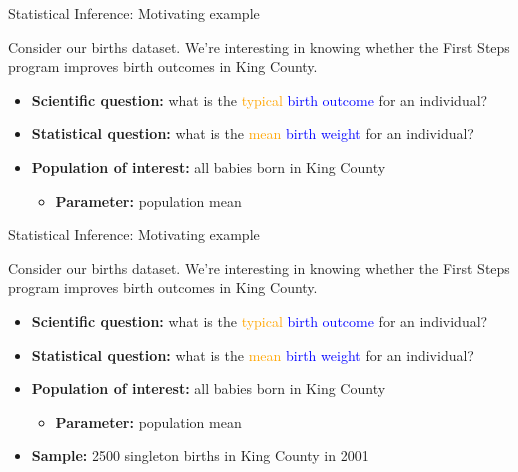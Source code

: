 \documentclass[10pt,t]{beamer}
\begin{document}
\begin{frame}{Statistical Inference: Motivating example}

Consider our births dataset. We're interesting in knowing whether the First Steps program improves birth outcomes in King County.

\vspace{0.1cm}

\begin{itemize}
	\item \textbf{Scientific question:} what is the \textcolor{orange}{typical}  \textcolor{blue}{birth outcome} for an individual?
	\item \textbf{Statistical question:} what is the \textcolor{orange}{mean} \textcolor{blue}{birth weight} for an individual?
	\item \textbf{Population of interest:} all babies born in King County
	\begin{itemize}
		\item \textbf{Parameter:} population mean
	\end{itemize}
\end{itemize}

\end{frame}

\begin{frame}{Statistical Inference: Motivating example}

Consider our births dataset. We're interesting in knowing whether the First Steps program improves birth outcomes in King County.

\vspace{0.1cm}

\begin{itemize}
	\item \textbf{Scientific question:} what is the \textcolor{orange}{typical}  \textcolor{blue}{birth outcome} for an individual?
	\item \textbf{Statistical question:} what is the \textcolor{orange}{mean} \textcolor{blue}{birth weight} for an individual?
	\item \textbf{Population of interest:} all babies born in King County
	\begin{itemize}
		\item \textbf{Parameter:} population mean
	\end{itemize}
	\item \textbf{Sample:} 2500 singleton births in King County in 2001
\end{itemize}

\end{frame}
\end{document}
